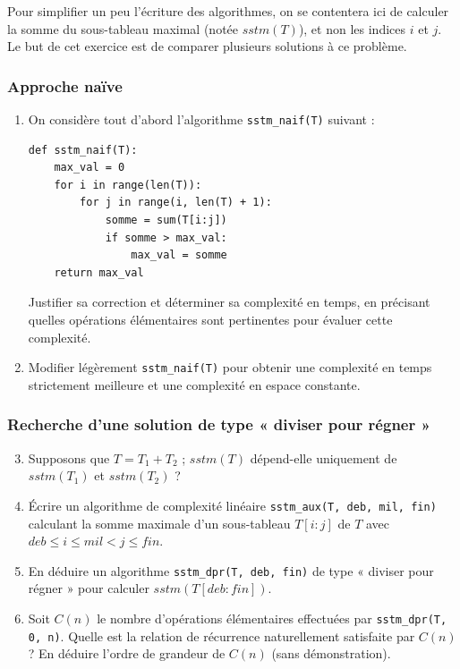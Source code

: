 \documentclass{article}
\begin{document}
Pour simplifier un peu l'écriture des algorithmes, on se contentera ici de calculer la somme du sous-tableau maximal (notée $sstm(T)$), et non les indices $i$ et $j$. Le but de cet exercice est de comparer plusieurs solutions à ce problème.

\subsubsection{Approche naïve}

\begin{enumerate}
    \item On considère tout d'abord l'algorithme \texttt{sstm\_naif(T)} suivant :
    
\begin{lstlisting}
def sstm_naif(T):
    max_val = 0
    for i in range(len(T)):
        for j in range(i, len(T) + 1):
            somme = sum(T[i:j])
            if somme > max_val:
                max_val = somme
    return max_val
\end{lstlisting}

    Justifier sa correction et déterminer sa complexité en temps, en précisant quelles opérations élémentaires sont pertinentes pour évaluer cette complexité.

    \item Modifier légèrement \texttt{sstm\_naif(T)} pour obtenir une complexité en temps strictement meilleure et une complexité en espace constante.
\end{enumerate}

\subsubsection{Recherche d'une solution de type « diviser pour régner »}

\begin{enumerate}
    \setcounter{enumi}{2}
    \item Supposons que $T = T_1 + T_2$ ; $sstm(T)$ dépend-elle uniquement de $sstm(T_1)$ et $sstm(T_2)$ ?
    
    \item Écrire un algorithme de complexité linéaire \texttt{sstm\_aux(T, deb, mil, fin)} calculant la somme maximale d'un sous-tableau $T[i:j]$ de $T$ avec $deb \le i \le mil < j \le fin$.
    
    \item En déduire un algorithme \texttt{sstm\_dpr(T, deb, fin)} de type « diviser pour régner » pour calculer $sstm(T[deb:fin])$.
    
    \item Soit $C(n)$ le nombre d'opérations élémentaires effectuées par \texttt{sstm\_dpr(T, 0, n)}. Quelle est la relation de récurrence naturellement satisfaite par $C(n)$ ? En déduire l'ordre de grandeur de $C(n)$ (sans démonstration).
\end{enumerate}
\end{document}
